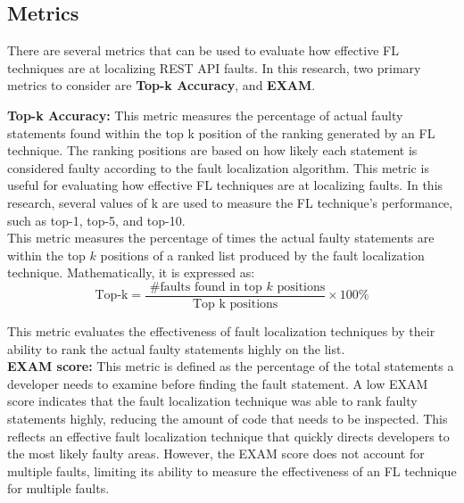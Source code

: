 \documentclass[conference]{IEEEtran}
\begin{document}
    
\subsection{Metrics}
\label{sec:metrics}

There are several metrics that can be used to evaluate how effective FL techniques are at localizing REST API faults. In this research, two primary metrics to consider are \textbf{Top-k Accuracy}, and \textbf{EXAM}.

\textbf{Top-k Accuracy:} This metric measures the percentage of actual faulty statements found within the top k position of the ranking generated by an FL technique. The ranking positions are based on how likely each statement is considered faulty according to the fault localization algorithm. This metric is useful for evaluating how effective FL techniques are at localizing faults. In this research, several values of k are used to measure the FL technique's performance, such as top-1, top-5, and top-10.
\\
This metric measures the percentage of times the actual faulty statements are within the top $k$ positions of a ranked list produced by the fault localization technique. Mathematically, it is expressed as:
    \[
        \text{Top-k} = \frac{\text{ \#faults found in top } k \text{ positions}}{\text{Top k positions}} \times 100\%
    \]

    This metric evaluates the effectiveness of fault localization techniques by their ability to rank the actual faulty statements highly on the list.
    \\

    \textbf{EXAM score:}  This metric is defined as the percentage of the total statements a developer needs to examine before finding the fault statement. A low EXAM score indicates that the fault localization technique was able to rank faulty statements highly, reducing the amount of code that needs to be inspected. This reflects an effective fault localization technique that quickly directs developers to the most likely faulty areas. However, the EXAM score does not account for multiple faults, limiting its ability to measure the effectiveness of an FL technique for multiple faults.
\end{document}
